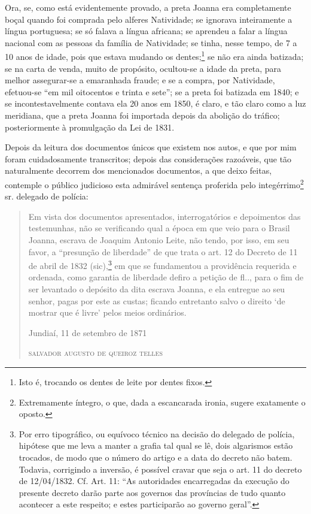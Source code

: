 Ora, se, como está evidentemente provado, a preta Joanna era
completamente boçal quando foi comprada pelo alferes Natividade; se
ignorava inteiramente a língua portuguesa; se só falava a língua
africana; se aprendeu a falar a língua nacional com as pessoas da
família de Natividade; se tinha, nesse tempo, de 7 a 10 anos de idade,
pois que estava mudando os dentes;\footnote{ Isto é, trocando os dentes
  de leite por dentes fixos.} se não era ainda batizada; se na carta de
venda, muito de propósito, ocultou-se a idade da preta, para melhor
assegurar-se a emaranhada fraude; e se a compra, por Natividade,
efetuou-se ``em mil oitocentos e trinta e sete''; se a preta foi batizada
em 1840; e se incontestavelmente contava ela 20 anos em 1850, é claro, e
tão claro como a luz meridiana, que a preta Joanna foi importada depois
da abolição do tráfico; posteriormente à promulgação da Lei de 1831.

Depois da leitura dos documentos únicos que existem nos autos, e que por
mim foram cuidadosamente transcritos; depois das considerações
razoáveis, que tão naturalmente decorrem dos mencionados documentos, a
que deixo feitas, contemple o público judicioso esta admirável sentença
proferida pelo integérrimo\footnote{ Extremamente íntegro, o que, dada
  a escancarada ironia, sugere exatamente o oposto.} sr. delegado de
polícia:

\begin{quote}
Em vista dos documentos apresentados, interrogatórios e depoimentos das
testemunhas, não se verificando qual a época em que veio para o Brasil
Joanna, escrava de Joaquim Antonio Leite, não tendo, por isso, em seu
favor, a ``presunção de liberdade'' de que trata o art. 12 do Decreto de
11 de abril de 1832 (sic),\footnote{ Por erro tipográfico, ou equívoco
  técnico na decisão do delegado de polícia, hipótese que me leva a
  manter a grafia tal qual se lê, dois algarismos estão trocados, de
  modo que o número do artigo e a data do decreto não batem. Todavia,
  corrigindo a inversão, é possível cravar que seja o art. 11 do decreto
  de 12/04/1832. Cf. Art. 11: ``As autoridades encarregadas da execução
  do presente decreto darão parte aos governos das províncias de tudo
  quanto acontecer a este respeito; e estes participarão ao governo
  geral''.} em que se fundamentou a providência requerida e ordenada,
como garantia de liberdade defiro a petição de fl.., para o fim de ser
levantado o depósito da dita escrava Joanna, e ela entregue ao seu
senhor, pagas por este as custas; ficando entretanto salvo o direito `de
mostrar que é livre' pelos meios ordinários.

\begin{flushright}
Jundiaí, 11 de setembro de 1871

\textsc{salvador augusto de queiroz telles}
\end{flushright}
\end{quote}


